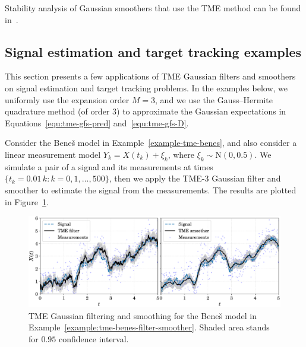Stability analysis of Gaussian smoothers that use the TME method can be found in~\citet{ZhaoZTMEsmoother2021}.

\subsection{Signal estimation and target tracking examples}
\label{sec:tme-gfs-examples}
This section presents a few applications of TME Gaussian filters and smoothers on signal estimation and target tracking problems. In the examples below, we uniformly use the expansion order $M=3$, and we use the Gauss--Hermite quadrature method (of order 3) to approximate the Gaussian expectations in Equations~\eqref{equ:tme-gfs-pred} and~\eqref{equ:tme-gfs-D}.

\begin{example}[Bene\v{s}]
	\label{example:tme-benes-filter-smoother}
	Consider the Bene\v{s} model in Example~\ref{example-tme-benes}, and also consider a linear measurement model $Y_k = X(t_k) + \xi_k$, where $\xi_k \sim \mathrm{N}(0, 0.5)$. We simulate a pair of a signal and its measurements at times $\lbrace t_k=0.01 \, k \colon k=0,1,\ldots, 500 \rbrace$, then we apply the TME-3 Gaussian filter and smoother to estimate the signal from the measurements. The results are plotted in Figure~\ref{fig:tme-benes-filter-smoother}.
\end{example}

\begin{figure}[t!]
	\centering
	\includegraphics[width=.99\linewidth]{figs/tme-benes-filter-smoother}
	\caption{TME Gaussian filtering and smoothing for the Bene\v{s} model in Example~\ref{example:tme-benes-filter-smoother}. Shaded area stands for $0.95$ confidence interval.}
	\label{fig:tme-benes-filter-smoother}
\end{figure}

